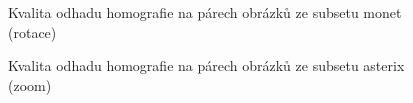 \begin{figure}[htp] 
	\caption{Kvalita odhadu homografie na párech obrázků ze subsetu monet (rotace)}	\label{graph_monet}
\end{figure}

\begin{figure}[htp] 
	\caption{Kvalita odhadu homografie na párech obrázků ze subsetu asterix (zoom)}	\label{graph_asterix}
\end{figure}
